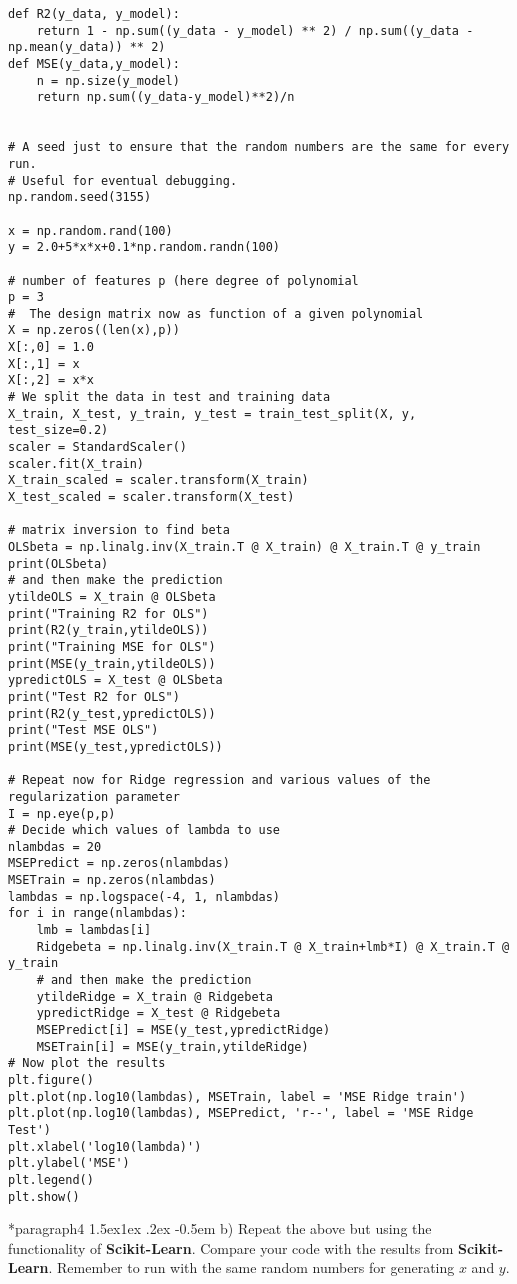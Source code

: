 \documentclass[%
oneside,                 %
final,                   %
10pt]{article}
\makeatletter
\newenvironment{doconceexercise}{}{}
\newcommand\subex{\@startsection*{paragraph}{4}{\z@}%
                  {1.5ex\@plus1ex \@minus.2ex}%
                  {-0.5em}%
                  {\normalfont\normalsize\bfseries}}
\makeatother
\begin{document}
\begin{doconceexercise}
\begin{verbatim}
def R2(y_data, y_model):
    return 1 - np.sum((y_data - y_model) ** 2) / np.sum((y_data - np.mean(y_data)) ** 2)
def MSE(y_data,y_model):
    n = np.size(y_model)
    return np.sum((y_data-y_model)**2)/n


# A seed just to ensure that the random numbers are the same for every run.
# Useful for eventual debugging.
np.random.seed(3155)

x = np.random.rand(100)
y = 2.0+5*x*x+0.1*np.random.randn(100)

# number of features p (here degree of polynomial
p = 3
#  The design matrix now as function of a given polynomial
X = np.zeros((len(x),p))
X[:,0] = 1.0
X[:,1] = x
X[:,2] = x*x
# We split the data in test and training data
X_train, X_test, y_train, y_test = train_test_split(X, y, test_size=0.2)
scaler = StandardScaler()
scaler.fit(X_train)
X_train_scaled = scaler.transform(X_train)
X_test_scaled = scaler.transform(X_test)

# matrix inversion to find beta
OLSbeta = np.linalg.inv(X_train.T @ X_train) @ X_train.T @ y_train
print(OLSbeta)
# and then make the prediction
ytildeOLS = X_train @ OLSbeta
print("Training R2 for OLS")
print(R2(y_train,ytildeOLS))
print("Training MSE for OLS")
print(MSE(y_train,ytildeOLS))
ypredictOLS = X_test @ OLSbeta
print("Test R2 for OLS")
print(R2(y_test,ypredictOLS))
print("Test MSE OLS")
print(MSE(y_test,ypredictOLS))

# Repeat now for Ridge regression and various values of the regularization parameter
I = np.eye(p,p)
# Decide which values of lambda to use
nlambdas = 20
MSEPredict = np.zeros(nlambdas)
MSETrain = np.zeros(nlambdas)
lambdas = np.logspace(-4, 1, nlambdas)
for i in range(nlambdas):
    lmb = lambdas[i]
    Ridgebeta = np.linalg.inv(X_train.T @ X_train+lmb*I) @ X_train.T @ y_train
    # and then make the prediction
    ytildeRidge = X_train @ Ridgebeta
    ypredictRidge = X_test @ Ridgebeta
    MSEPredict[i] = MSE(y_test,ypredictRidge)
    MSETrain[i] = MSE(y_train,ytildeRidge)
# Now plot the results
plt.figure()
plt.plot(np.log10(lambdas), MSETrain, label = 'MSE Ridge train')
plt.plot(np.log10(lambdas), MSEPredict, 'r--', label = 'MSE Ridge Test')
plt.xlabel('log10(lambda)')
plt.ylabel('MSE')
plt.legend()
plt.show()
\end{verbatim}


\subex{b)}
Repeat the above but using the functionality of \textbf{Scikit-Learn}. Compare your code with the results from \textbf{Scikit-Learn}. Remember to run with the same random numbers for generating $x$ and $y$.



\end{doconceexercise}
\end{document}
